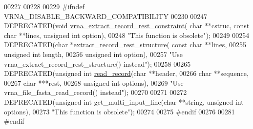 \begin{DoxyCode}
00227 
00228 
00229 \textcolor{preprocessor}{#ifndef VRNA\_DISABLE\_BACKWARD\_COMPATIBILITY}
00230 
00247 DEPRECATED(\textcolor{keywordtype}{void} \hyperlink{group__file__formats_ga55a9ae6dfeecc1b3f0c2acf6fa796c15}{vrna\_extract\_record\_rest\_constraint}( \textcolor{keywordtype}{char} **cstruc, \textcolor{keyword}{
      const} \textcolor{keywordtype}{char} **lines, \textcolor{keywordtype}{unsigned} \textcolor{keywordtype}{int} option),
00248           \textcolor{stringliteral}{"This function is obsolete"});
00249 
00254 DEPRECATED(\textcolor{keywordtype}{char} *extract\_record\_rest\_structure( \textcolor{keyword}{const} \textcolor{keywordtype}{char} **lines,
00255                                                 \textcolor{keywordtype}{unsigned} \textcolor{keywordtype}{int} length,
00256                                                 \textcolor{keywordtype}{unsigned} \textcolor{keywordtype}{int} option),
00257           \textcolor{stringliteral}{"Use vrna\_extract\_record\_rest\_structure() instead"});
00258 
00265 DEPRECATED(\textcolor{keywordtype}{unsigned} \textcolor{keywordtype}{int} \hyperlink{group__file__formats_gafd194a69af9d92b5b0412a7627ac1595}{read\_record}(\textcolor{keywordtype}{char} **header,
00266                                     \textcolor{keywordtype}{char} **sequence,
00267                                     \textcolor{keywordtype}{char}  ***rest,
00268                                     \textcolor{keywordtype}{unsigned} \textcolor{keywordtype}{int} options),
00269           \textcolor{stringliteral}{"Use vrna\_file\_fasta\_read\_record() instead"});
00270 
00271 
00272 DEPRECATED(\textcolor{keywordtype}{unsigned} \textcolor{keywordtype}{int} get\_multi\_input\_line(\textcolor{keywordtype}{char} **\textcolor{keywordtype}{string}, \textcolor{keywordtype}{unsigned} \textcolor{keywordtype}{int} options),
00273           \textcolor{stringliteral}{"This function is obsolete"});
00274 
00275 \textcolor{preprocessor}{#endif}
00276 
00281 \textcolor{preprocessor}{#endif}
\end{DoxyCode}
